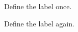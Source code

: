 \documentclass{article}
\begin{document}
Define the label once. \label{DefinedTwice}

Define the label again. \label{DefinedTwice}
\end{document}
